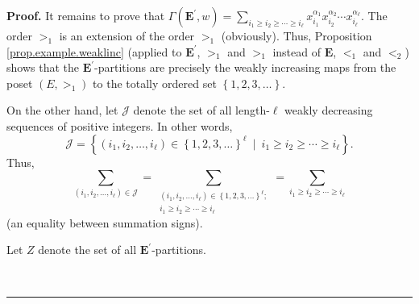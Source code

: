 \documentclass[numbers=enddot,12pt,final,onecolumn,notitlepage,abstracton]{scrartcl}
\theoremstyle{definition}
\newenvironment{proof}[1][Proof]{\noindent\textbf{#1.} }{\ \rule{0.5em}{0.5em}}
\let\sumnonlimits\sum
\renewcommand{\sum}{\sumnonlimits\limits}
\newenvironment{verlong}{}{}
\begin{document}
\begin{verlong}
\begin{footnotesize}
\begin{proof}
It remains to prove that $\Gamma\left(  \mathbf{E}^{\prime},w\right)
=\sum_{i_{1}\geq i_{2}\geq\cdots\geq i_{\ell}}x_{i_{1}}^{\alpha_{1}}x_{i_{2}%
}^{\alpha_{2}}\cdots x_{i_{\ell}}^{\alpha_{\ell}}$. The order $>_{1}$ is an
extension of the order $>_{1}$ (obviously). Thus, Proposition
\ref{prop.example.weaklinc} (applied to $\mathbf{E}^{\prime}$, $>_{1}$ and
$>_{1}$ instead of $\mathbf{E}$, $<_{1}$ and $<_{2}$) shows that the
$\mathbf{E}^{\prime}$-partitions are precisely the weakly increasing maps from
the poset $\left(  E,>_{1}\right)  $ to the totally ordered set $\left\{
1,2,3,\ldots\right\}  $.

On the other hand, let $\mathcal{J}$ denote the set of all length-$\ell$
weakly decreasing sequences of positive integers. In other words,%
\[
\mathcal{J}=\left\{  \left(  i_{1},i_{2},\ldots,i_{\ell}\right)  \in\left\{
1,2,3,\ldots\right\}  ^{\ell}\ \mid\ i_{1}\geq i_{2}\geq\cdots\geq i_{\ell
}\right\}  .
\]
Thus,%
\[
\sum_{\left(  i_{1},i_{2},\ldots,i_{\ell}\right)  \in\mathcal{J}}%
=\sum_{\substack{\left(  i_{1},i_{2},\ldots,i_{\ell}\right)  \in\left\{
1,2,3,\ldots\right\}  ^{\ell};\\i_{1}\geq i_{2}\geq\cdots\geq i_{\ell}}%
}=\sum_{i_{1}\geq i_{2}\geq\cdots\geq i_{\ell}}%
\]
(an equality between summation signs).

Let $Z$ denote the set of all $\mathbf{E}^{\prime}$-partitions.


\end{proof}
\end{footnotesize}
\end{verlong}
\end{document}
